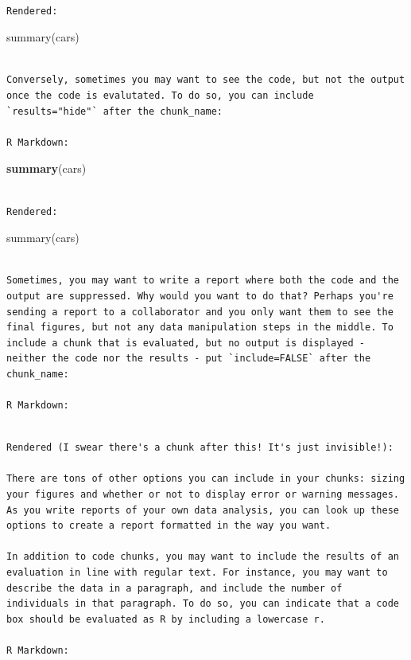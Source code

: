 \documentclass[
]{book}
\newenvironment{Shaded}{\begin{snugshade}}{\end{snugshade}}
\newcommand{\KeywordTok}[1]{\textcolor[rgb]{0.13,0.29,0.53}{\textbf{#1}}}
\newcommand{\NormalTok}[1]{#1}
\begin{document}
\begin{verbatim}

Rendered:
\end{verbatim}

summary(cars)

\begin{verbatim}

Conversely, sometimes you may want to see the code, but not the output once the code is evalutated. To do so, you can include `results="hide"` after the chunk_name:

R Markdown:
\end{verbatim}

\begin{Shaded}
\begin{Highlighting}[]
\KeywordTok{summary}\NormalTok{(cars)}
\end{Highlighting}
\end{Shaded}

\begin{verbatim}

Rendered:
\end{verbatim}

summary(cars)

\begin{verbatim}

Sometimes, you may want to write a report where both the code and the output are suppressed. Why would you want to do that? Perhaps you're sending a report to a collaborator and you only want them to see the final figures, but not any data manipulation steps in the middle. To include a chunk that is evaluated, but no output is displayed - neither the code nor the results - put `include=FALSE` after the chunk_name:

R Markdown:
\end{verbatim}

\begin{verbatim}

Rendered (I swear there's a chunk after this! It's just invisible!):

There are tons of other options you can include in your chunks: sizing your figures and whether or not to display error or warning messages. As you write reports of your own data analysis, you can look up these options to create a report formatted in the way you want.

In addition to code chunks, you may want to include the results of an evaluation in line with regular text. For instance, you may want to describe the data in a paragraph, and include the number of individuals in that paragraph. To do so, you can indicate that a code box should be evaluated as R by including a lowercase r.

R Markdown:
\end{verbatim}
\end{document}
